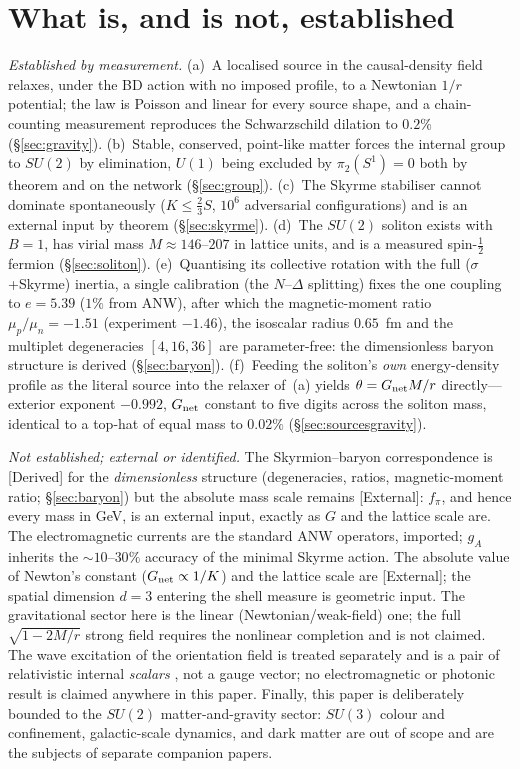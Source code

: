 \documentclass[aps,prd,reprint,nofootinbib,superscriptaddress,floatfix]{revtex4-2}
\theoremstyle{plain}
\newcommand{\Sderiv}{\textsf{[Derived]}}
\newcommand{\Sext}{\textsf{[External]}}
\newcommand{\su}[1]{SU(#1)}
\begin{document}
\section{What is, and is not, established}\label{sec:claim}

\emph{Established by measurement.}
(a)~A localised source in the causal-density field relaxes, under the BD action with
no imposed profile, to a Newtonian $1/r$ potential; the law is Poisson and linear for
every source shape, and a chain-counting measurement reproduces the Schwarzschild
dilation to $0.2\%$ (\S\ref{sec:gravity}).
(b)~Stable, conserved, point-like matter forces the internal group to $\su2$ by
elimination, $U(1)$ being excluded by $\pi_2(S^1)=0$ both by theorem and on the
network (\S\ref{sec:group}).
(c)~The Skyrme stabiliser cannot dominate spontaneously ($K\le\tfrac23 S$, $10^6$
adversarial configurations) and is an external input by theorem (\S\ref{sec:skyrme}).
(d)~The $\su2$ soliton exists with $B=1$, has virial mass $M\approx146$--$207$ in
lattice units, and is a measured spin-$\tfrac12$ fermion (\S\ref{sec:soliton}).
(e)~Quantising its collective rotation with the full ($\sigma$+Skyrme) inertia, a
single calibration (the $N$--$\Delta$ splitting) fixes the one coupling to $e=5.39$
($1\%$ from ANW), after which the magnetic-moment ratio $\mu_p/\mu_n=-1.51$ (experiment
$-1.46$), the isoscalar radius $0.65$~fm and the multiplet degeneracies $[4,16,36]$ are
parameter-free: the dimensionless baryon structure is derived (\S\ref{sec:baryon}).
(f)~Feeding the soliton's \emph{own} energy-density profile as the literal source into
the relaxer of~(a) yields $\theta=G_{\rm net}M/r$ directly---exterior exponent $-0.992$,
$G_{\rm net}$ constant to five digits across the soliton mass, identical to a top-hat of
equal mass to $0.02\%$ (\S\ref{sec:sourcesgravity}).

\emph{Not established; external or identified.} The Skyrmion--baryon correspondence is
\Sderiv{} for the \emph{dimensionless} structure (degeneracies, ratios,
magnetic-moment ratio; \S\ref{sec:baryon}) but the absolute mass scale remains \Sext{}:
$f_\pi$, and hence every mass in GeV, is an external input, exactly as $G$ and the
lattice scale are. The electromagnetic currents are the standard ANW operators,
imported; $g_A$ inherits the $\sim10$--$30\%$ accuracy of the minimal Skyrme action. The
absolute value of Newton's constant ($G_{\rm net}\propto
1/K$) and the lattice scale are \Sext{}; the spatial dimension $d=3$ entering the
shell measure is geometric input. The gravitational sector here is the linear
(Newtonian/weak-field) one; the full $\sqrt{1-2M/r}$ strong field requires the
nonlinear completion and is not claimed. The wave excitation of the orientation field
is treated separately and is a pair of relativistic internal \emph{scalars}
\cite{GoldstonePRD}, not a gauge vector; no electromagnetic or photonic result is
claimed anywhere in this paper. Finally, this paper is deliberately bounded to the
$\su2$ matter-and-gravity sector: $\su3$ colour and confinement, galactic-scale
dynamics, and dark matter are out of scope and are the subjects of separate companion
papers.
\end{document}
